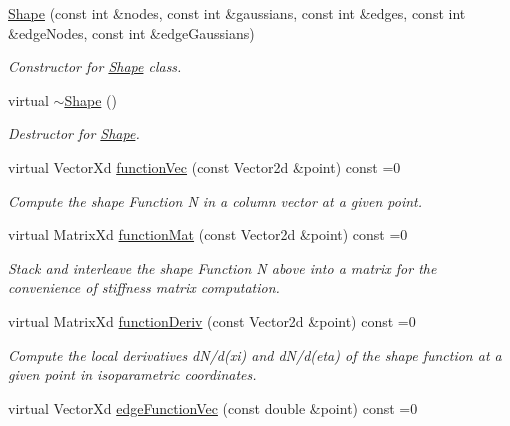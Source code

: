 \begin{DoxyCompactItemize}
\item 
\mbox{\hyperlink{class_shape_aab720d4a61d7f8016ab9a72bab846cbe}{Shape}} (const int \&nodes, const int \&gaussians, const int \&edges, const int \&edge\+Nodes, const int \&edge\+Gaussians)
\begin{DoxyCompactList}\small\item\em Constructor for \mbox{\hyperlink{class_shape}{Shape}} class. \end{DoxyCompactList}\item 
\mbox{\label{class_shape_ac3b9fc48965274893f25b18aa14ba665}} 
virtual \mbox{\hyperlink{class_shape_ac3b9fc48965274893f25b18aa14ba665}{$\sim$\+Shape}} ()
\begin{DoxyCompactList}\small\item\em Destructor for \mbox{\hyperlink{class_shape}{Shape}}. \end{DoxyCompactList}\item 
virtual Vector\+Xd \mbox{\hyperlink{class_shape_a0e0400bca54c29b5097c84ace51ecc7b}{function\+Vec}} (const Vector2d \&point) const =0
\begin{DoxyCompactList}\small\item\em Compute the shape Function N in a column vector at a given point. \end{DoxyCompactList}\item 
virtual Matrix\+Xd \mbox{\hyperlink{class_shape_a7a2dc7c642bdea2a1359e3795fd9414d}{function\+Mat}} (const Vector2d \&point) const =0
\begin{DoxyCompactList}\small\item\em Stack and interleave the shape Function N above into a matrix for the convenience of stiffness matrix computation. \end{DoxyCompactList}\item 
virtual Matrix\+Xd \mbox{\hyperlink{class_shape_a29de5d31e0fa74a4d1067f6d14cd94ed}{function\+Deriv}} (const Vector2d \&point) const =0
\begin{DoxyCompactList}\small\item\em Compute the local derivatives d\+N/d(xi) and d\+N/d(eta) of the shape function at a given point in isoparametric coordinates. \end{DoxyCompactList}\item 
virtual Vector\+Xd \mbox{\hyperlink{class_shape_aeb6b5b956ca89b571d17ee7e140bb689}{edge\+Function\+Vec}} (const double \&point) const =0

\end{DoxyCompactItemize}

